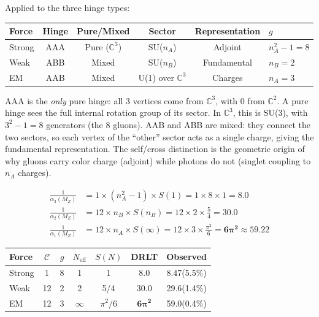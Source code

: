 Applied to the three hinge types:
\begin{center}
\begin{tabular}{lccccl}
\hline
Force & Hinge & Pure/Mixed & Sector & Representation & $g$ \\
\hline
Strong & AAA & Pure ($\mathbb{C}^3$) & SU($n_A$) & Adjoint & $n_A^2 - 1 = 8$ \\
Weak & ABB & Mixed & SU($n_B$) & Fundamental & $n_B = 2$ \\
EM & AAB & Mixed & U(1) over $\mathbb{C}^3$ & Charges & $n_A = 3$ \\
\hline
\end{tabular}
\end{center}

\begin{remark}
AAA is the \emph{only} pure hinge: all 3 vertices come from $\mathbb{C}^3$, with 0 from $\mathbb{C}^2$. A pure hinge sees the full internal rotation group of its sector. In $\mathbb{C}^3$, this is SU(3), with $3^2 - 1 = 8$ generators (the 8 gluons). AAB and ABB are mixed: they connect the two sectors, so each vertex of the ``other'' sector acts as a single charge, giving the fundamental representation. The self/cross distinction is the geometric origin of why gluons carry color charge (adjoint) while photons do not (singlet coupling to $n_A$ charges).
\end{remark}

\begin{theorem}
\label{thm:couplings}
\begin{align}
\frac{1}{\alpha_3(M_Z)} &= 1 \times (n_A^2 - 1) \times S(1) = 1 \times 8 \times 1 = \mathbf{8.0} \label{eq:alpha3} \\
\frac{1}{\alpha_2(M_Z)} &= 12 \times n_B \times S(n_B) = 12 \times 2 \times \frac{5}{4} = \mathbf{30.0} \label{eq:alpha2} \\
\frac{1}{\alpha_1(M_Z)} &= 12 \times n_A \times S(\infty) = 12 \times 3 \times \frac{\pi^2}{6} = \mathbf{6\pi^2} \approx 59.22 \label{eq:alpha1}
\end{align}
\end{theorem}

\begin{center}
\begin{tabular}{lcccccc}
\hline
Force & $\mathcal{C}$ & $g$ & $N_\text{eff}$ & $S(N)$ & DRLT & Observed \\
\hline
Strong & 1 & 8 & 1 & 1 & $\mathbf{8.0}$ & 8.47\;(5.5\%) \\
Weak & 12 & 2 & 2 & 5/4 & $\mathbf{30.0}$ & 29.6\;(1.4\%) \\
EM & 12 & 3 & $\infty$ & $\pi^2/6$ & $\mathbf{6\pi^2}$ & 59.0\;(0.4\%) \\
\hline
\end{tabular}
\end{center}

